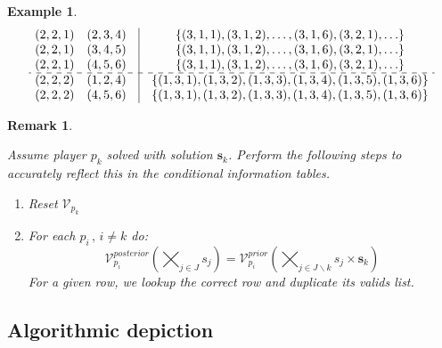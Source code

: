 \documentclass{article}
\newtheorem{remark}{Remark}[section]
\newtheorem{example}{Example}[section]
\begin{document}
\begin{example}
\[\begin{array}{cccc}
(2,2,1) & (2,3,4) & \vline & \{ (3,1,1), (3,1,2), \ldots, (3,1,6), (3,2,1), \ldots \} \\
(2,2,1) & (3,4,5) & \vline & \{ (3,1,1), (3,1,2), \ldots, (3,1,6), (3,2,1), \ldots \} \\
(2,2,1) & (4,5,6) & \vline & \{ (3,1,1), (3,1,2), \ldots, (3,1,6), (3,2,1), \ldots \} \\  \hdashline

(2,2,2) & (1,2,4) & \vline & \{ (1,3,1), (1,3,2), (1,3,3), (1,3,4), (1,3,5), (1,3,6) \} \\
(2,2,2) & (4,5,6) & \vline & \{ (1,3,1), (1,3,2), (1,3,3), (1,3,4), (1,3,5), (1,3,6) \} \\  
\end{array} 
\]

\end{example}

\begin{remark}\label{rem:reset}

Assume player $p_k$ solved with solution $\mathbf{s}_k$. Perform the following steps to accurately reflect this in the conditional information tables.

\begin{enumerate}
\item Reset $\mathcal{V}_{p_k}$
\item For each $p_i \, , \, i \neq k$ do: 
\begin{equation} 
\mathcal{V}_{p_i}^{posterior}(\bigtimes_{j \in J} s_j) = \mathcal{V}_{p_i}^{prior}(\bigtimes_{j \in J \backslash k} s_j \times \mathbf{s}_k) 
\label{Eq:reset}
\end{equation}
For a given row, we lookup the correct row and duplicate its valids list.
\end{enumerate}

\end{remark}

\newpage

\subsection{Algorithmic depiction}
\end{document}
